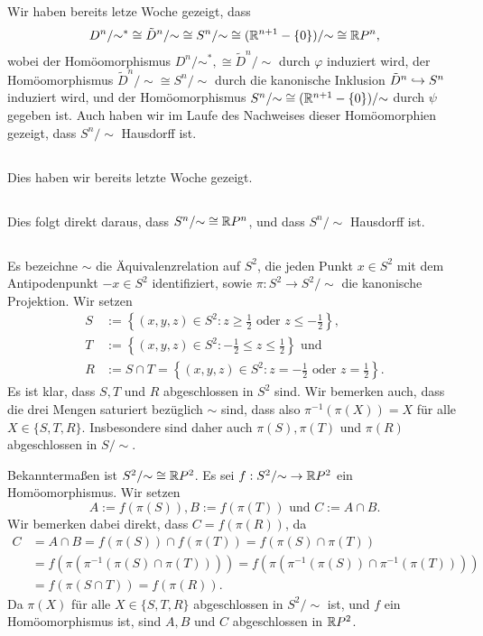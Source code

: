 \documentclass[a4paper,10pt]{article}
\begin{document}
Wir haben bereits letze Woche gezeigt, dass
\[
 D^n/{\sim^*}
 \cong \tilde{D}^n/{\sim}
 \cong S^n/{\sim}
 \cong (\mathbb{R}^{n+1}-\{0\})/{\sim}
 \cong \mathbb{R} P^n,
\]
wobei der Homöomorphismus $D^n/{\sim}^*, \cong \tilde{D}^n/{\sim}$ durch $\varphi$ induziert wird, der Homöomorphismus $\tilde{D}^n/{\sim} \cong S^n/{\sim}$ durch die kanonische Inklusion $\tilde{D}^n \hookrightarrow S^n$ induziert wird, und der Homöomorphismus $S^n/{\sim} \cong (\mathbb{R}^{n+1}-\{0\})/{\sim}$ durch $\psi$ gegeben ist. Auch haben wir im Laufe des Nachweises dieser Homöomorphien gezeigt, dass $S^n/{\sim}$ Hausdorff ist.


\subsection{}
Dies haben wir bereits letzte Woche gezeigt.


\subsection{}
Dies folgt direkt daraus, dass $S^n /{\sim} \cong \mathbb{R} P^n$, und dass $S^n/{\sim}$ Hausdorff ist.


\subsection{}
Es bezeichne $\sim$ die Äquivalenzrelation auf $S^2$, die jeden Punkt $x \in S^2$ mit dem Antipodenpunkt $-x \in S^2$ identifiziert, sowie $\pi : S^2 \to S^2/{\sim}$ die kanonische Projektion.
Wir setzen
\begin{align*}
 S &:= \left\{(x,y,z) \in S^2 : z \geq \frac{1}{2} \text{ oder } z \leq -\frac{1}{2} \right\}, \\
 T &:= \left\{(x,y,z) \in S^2 : -\frac{1}{2} \leq z \leq \frac{1}{2}\right\} \text{ und} \\
 R &:= S \cap T = \left\{(x,y,z) \in S^2 : z = -\frac{1}{2} \text{ oder } z = \frac{1}{2} \right\}.
\end{align*}
Es ist klar, dass $S,T$ und $R$ abgeschlossen in $S^2$ sind. Wir bemerken auch, dass die drei Mengen saturiert bezüglich $\sim$ sind, dass also $\pi^{-1}(\pi(X)) = X$ für alle $X \in \{S,T,R\}$. Insbesondere sind daher auch $\pi(S), \pi(T)$ und $\pi(R)$ abgeschlossen in $S/{\sim}$.

Bekanntermaßen ist $S^2 /{\sim} \cong \mathbb{R} P^2$. Es sei $f : S^2 /{\sim} \to \mathbb{R} P^2$ ein Homöomorphismus. Wir setzen
\[
 A := f(\pi(S)), B := f(\pi(T)) \text{ und } C := A \cap B.
\]
Wir bemerken dabei direkt, dass $C =  f(\pi(R))$, da
\begin{align*}
 C
 &= A \cap B
 = f(\pi(S)) \cap f(\pi(T))
 = f(\pi(S) \cap \pi(T)) \\
 &= f(\pi(\pi^{-1}(\pi(S) \cap \pi(T))))
 = f(\pi(\pi^{-1}(\pi(S)) \cap \pi^{-1}(\pi(T)))) \\
 &= f(\pi(S \cap T))
 = f(\pi(R)).
\end{align*}
Da $\pi(X)$ für alle $X \in \{S,T,R\}$ abgeschlossen in $S^2/{\sim}$ ist, und $f$ ein Homöomorphismus ist, sind $A, B$ und $C$ abgeschlossen in $\mathbb{R} P^2$.
\end{document}
